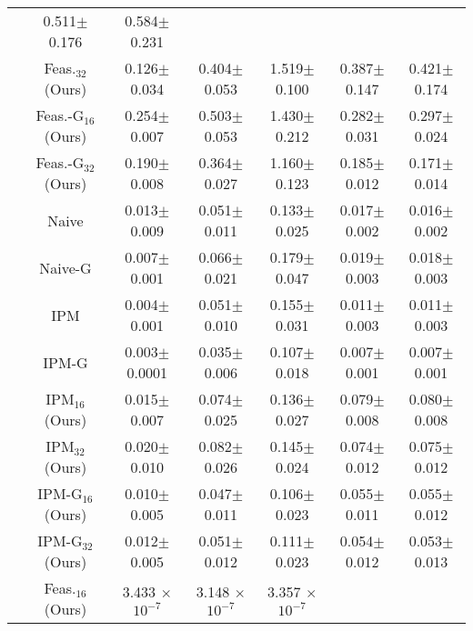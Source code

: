 \begin{table*}[t]
{\begin{tabular}{ccccccc}
& 0.511\scriptsize$\pm$0.176 & 0.584\scriptsize$\pm$0.231 \\
& Feas.$_{32}$ (Ours) & 0.126\scriptsize$\pm$0.034 & 0.404\scriptsize$\pm$0.053 & 1.519\scriptsize$\pm$0.100
& 0.387\scriptsize$\pm$0.147 & 0.421\scriptsize$\pm$0.174 \\
& Feas.-G$_{16}$ (Ours) & 0.254\scriptsize$\pm$0.007 & 0.503\scriptsize$\pm$0.053 & 1.430\scriptsize$\pm$0.212
& 0.282\scriptsize$\pm$0.031 & 0.297\scriptsize$\pm$0.024 \\
& Feas.-G$_{32}$ (Ours) & 0.190\scriptsize$\pm$0.008 & 0.364\scriptsize$\pm$0.027 & 1.160\scriptsize$\pm$0.123
& 0.185\scriptsize$\pm$0.012 & 0.171\scriptsize$\pm$0.014 \\
\midrule

{\multirow{12}{*}{Cons. vio.}}
& Naive \citeyear{chen2024qp} & 0.013\scriptsize$\pm$0.009 & 0.051\scriptsize$\pm$0.011 & 0.133\scriptsize$\pm$0.025
& 0.017\scriptsize$\pm$0.002 & 0.016\scriptsize$\pm$0.002  \\
& Naive-G \citeyear{chen2024qp} & 0.007\scriptsize$\pm$0.001 & 0.066\scriptsize$\pm$0.021 & 0.179\scriptsize$\pm$0.047
& 0.019\scriptsize$\pm$0.003 & 0.018\scriptsize$\pm$0.003 \\
\cmidrule{2-7}
& IPM \citeyear{pmlr-v238-qian24a} & 0.004\scriptsize$\pm$0.001 & 0.051\scriptsize$\pm$0.010 & 0.155\scriptsize$\pm$0.031
& 0.011\scriptsize$\pm$0.003 & 0.011\scriptsize$\pm$0.003\\
& IPM-G \citeyear{pmlr-v238-qian24a} & 0.003\scriptsize$\pm$0.0001 & 0.035\scriptsize$\pm$0.006 & 0.107\scriptsize$\pm$0.018
& 0.007\scriptsize$\pm$0.001 & 0.007\scriptsize$\pm$0.001 \\
\cmidrule{2-7}
& IPM$_{16}$ (Ours) & 0.015\scriptsize$\pm$0.007 & 0.074\scriptsize$\pm$0.025 & 0.136\scriptsize$\pm$0.027
& 0.079\scriptsize$\pm$0.008 & 0.080\scriptsize$\pm$0.008\\
& IPM$_{32}$ (Ours) & 0.020\scriptsize$\pm$0.010 & 0.082\scriptsize$\pm$0.026  & 0.145\scriptsize$\pm$0.024
& 0.074\scriptsize$\pm$0.012 & 0.075\scriptsize$\pm$0.012\\
& IPM-G$_{16}$ (Ours) & 0.010\scriptsize$\pm$0.005 & 0.047\scriptsize$\pm$0.011 & 0.106\scriptsize$\pm$0.023
& 0.055\scriptsize$\pm$0.011 & 0.055\scriptsize$\pm$0.012 \\
& IPM-G$_{32}$ (Ours) & 0.012\scriptsize$\pm$0.005 & 0.051\scriptsize$\pm$0.012 & 0.111\scriptsize$\pm$0.023
& 0.054\scriptsize$\pm$0.012 & 0.053\scriptsize$\pm$0.013 \\
\cmidrule{2-7}
& Feas.$_{16}$ (Ours) & 3.433 \(\times\) \(10^{-7}\) & 3.148 \(\times\) \(10^{-7}\) & 3.357 \(\times\) \(10^{-7}\)

\end{tabular}}
\end{table*}
